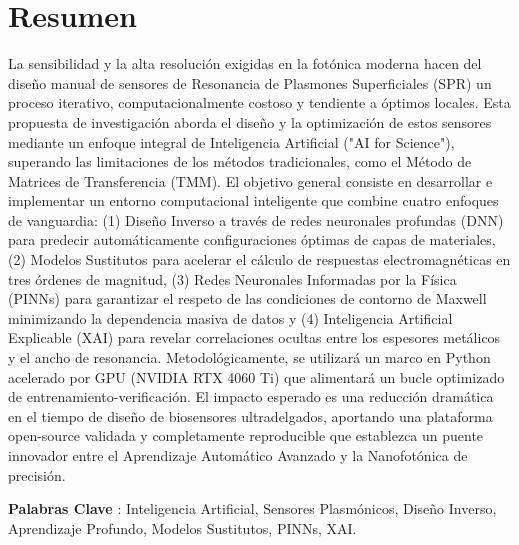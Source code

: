 \chapter*{Resumen}

La sensibilidad y la alta resolución exigidas en la fotónica moderna hacen del diseño manual de sensores de Resonancia de Plasmones Superficiales (SPR) un proceso iterativo, computacionalmente costoso y tendiente a óptimos locales. Esta propuesta de investigación aborda el diseño y la optimización de estos sensores mediante un enfoque integral de Inteligencia Artificial ("AI for Science"), superando las limitaciones de los métodos tradicionales, como el Método de Matrices de Transferencia (TMM). El objetivo general consiste en desarrollar e implementar un entorno computacional inteligente que combine cuatro enfoques de vanguardia: (1) Diseño Inverso a través de redes neuronales profundas (DNN) para predecir automáticamente configuraciones óptimas de capas de materiales, (2) Modelos Sustitutos para acelerar el cálculo de respuestas electromagnéticas en tres órdenes de magnitud, (3) Redes Neuronales Informadas por la Física (PINNs) para garantizar el respeto de las condiciones de contorno de Maxwell minimizando la dependencia masiva de datos y (4) Inteligencia Artificial Explicable (XAI) para revelar correlaciones ocultas entre los espesores metálicos y el ancho de resonancia. Metodológicamente, se utilizará un marco en Python acelerado por GPU (NVIDIA RTX 4060 Ti) que alimentará un bucle optimizado de entrenamiento-verificación. El impacto esperado es una reducción dramática en el tiempo de diseño de biosensores ultradelgados, aportando una plataforma open-source validada y completamente reproducible que establezca un puente innovador entre el Aprendizaje Automático Avanzado y la Nanofotónica de precisión.


{\large \textbf{Palabras Clave} : }Inteligencia Artificial, Sensores Plasmónicos, Diseño Inverso, Aprendizaje Profundo, Modelos Sustitutos, PINNs, XAI.
